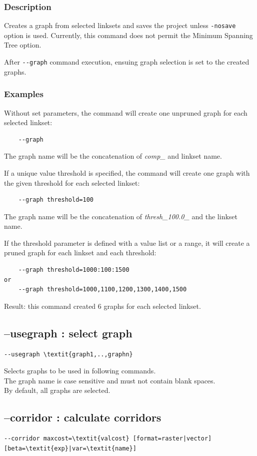 \documentclass[a4paper,10pt]{report}
\begin{document}
\subsubsection{Description}
Creates a graph from selected linksets and saves the project unless \verb|-nosave| option is used. 
Currently, this command does not permit the Minimum Spanning Tree option.

After \verb|--graph| command execution, ensuing graph selection is set to the created graphs.

\subsubsection{Examples}
Without set parameters, the command will create one unpruned graph for each selected linkset:
\begin{Verbatim}
	--graph
\end{Verbatim}
The graph name will be the concatenation of \textit{comp\_} and linkset name.

If a unique value threshold is specified, the command will create one graph with the given threshold for each selected linkset:
\begin{Verbatim}
	--graph threshold=100
\end{Verbatim}
The graph name will be the concatenation of \textit{thresh\_100.0\_} and the linkset name.

If the threshold parameter is defined with a value list or a range, it will create a pruned graph for each linkset and each threshold:
\begin{Verbatim}
	--graph threshold=1000:100:1500
or
	--graph threshold=1000,1100,1200,1300,1400,1500
\end{Verbatim}
Result: this command created 6 graphs for each selected linkset.


\subsection{--usegraph : select graph}
\label{usegraph}
\begin{Verbatim}[commandchars=\\\{\}]
--usegraph \textit{graph1,..,graphn}
\end{Verbatim}
Selects graphs to be used in following commands.\\
The graph name is case sensitive and must not contain blank spaces.\\
By default, all graphs are selected.

\subsection{--corridor : calculate corridors}
\begin{Verbatim}[commandchars=\\\{\}]
--corridor maxcost=\textit{valcost} [format=raster|vector] [beta=\textit{exp}|var=\textit{name}]
\end{Verbatim}
\end{document}
